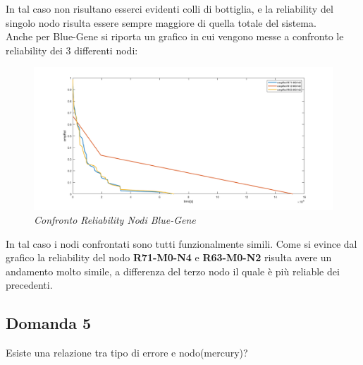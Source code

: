 In tal caso non risultano esserci evidenti colli di bottiglia, e la reliability del singolo nodo risulta essere sempre maggiore di quella totale del sistema.
\\Anche per Blue-Gene si riporta un grafico in cui vengono messe a confronto le reliability dei 3 differenti nodi:
\begin{figure}[H]
	\centering
	\includegraphics[width=\textwidth]{img/hw6/confrontoBG.png}
	\caption{\textit{Confronto Reliability Nodi Blue-Gene}}
\end{figure}
In tal caso i nodi confrontati sono tutti funzionalmente simili. Come si evince dal grafico la reliability del nodo \textbf{R71-M0-N4} e \textbf{R63-M0-N2} risulta avere un andamento molto simile, a differenza del terzo nodo il quale è più reliable dei precedenti.
\subsection{Domanda 5}
Esiste una relazione tra tipo di errore e nodo(mercury)?

